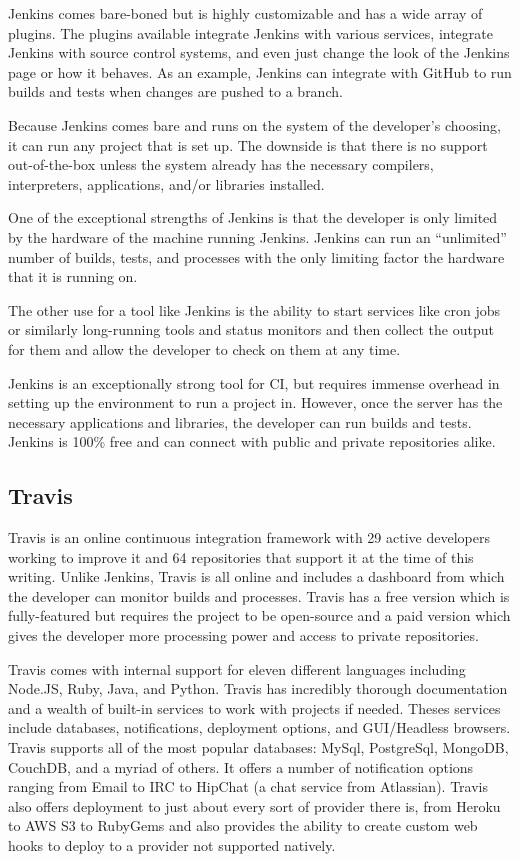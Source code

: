 \documentclass[12pt]{ucthesis}
\begin{document}
Jenkins comes bare-boned but is highly customizable and has a wide array of plugins. The plugins available integrate Jenkins with various services, integrate Jenkins with source control systems, and even just change the look of the Jenkins page or how it behaves. As an example, Jenkins can integrate with GitHub to run builds and tests when changes are pushed to a branch.

Because Jenkins comes bare and runs on the system of the developer's choosing, it can run any project that is set up. The downside is that there is no support out-of-the-box unless the system already has the necessary compilers, interpreters, applications, and/or libraries installed.

One of the exceptional strengths of Jenkins is that the developer is only limited by the hardware of the machine running Jenkins. Jenkins can run an ``unlimited'' number of builds, tests, and processes with the only limiting factor the hardware that it is running on.

The other use for a tool like Jenkins is the ability to start services like cron jobs or similarly long-running tools and status monitors and then collect the output for them and allow the developer to check on them at any time.

Jenkins is an exceptionally strong tool for CI, but requires immense overhead in setting up the environment to run a project in. However, once the server has the necessary applications and libraries, the developer can run builds and tests. Jenkins is 100\% free and can connect with public and private repositories alike.

\subsection{Travis}
Travis\cite{Travis} is an online continuous integration framework with 29 active developers working to improve it and 64 repositories that support it at the time of this writing. Unlike Jenkins, Travis is all online and includes a dashboard from which the developer can monitor builds and processes. Travis has a free version which is fully-featured but requires the project to be open-source and a paid version which gives the developer more processing power and access to private repositories.

Travis comes with internal support for eleven different languages including Node.JS, Ruby, Java, and Python. Travis has incredibly thorough documentation and a wealth of built-in services to work with projects if needed. Theses services include databases, notifications, deployment options, and GUI/Headless browsers. Travis supports all of the most popular databases: MySql, PostgreSql, MongoDB, CouchDB, and a myriad of others. It offers a number of notification options ranging from Email to IRC to HipChat (a chat service from Atlassian). Travis also offers deployment to just about every sort of provider there is, from Heroku to AWS S3 to RubyGems and also provides the ability to create custom web hooks to deploy to a provider not supported natively.
\end{document}
